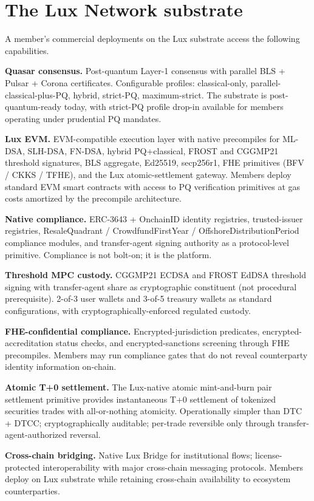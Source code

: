 \documentclass[11pt,letterpaper]{article}
\begin{document}
\section{The Lux Network substrate}

A member's commercial deployments on the Lux substrate access the following capabilities.

\textbf{Quasar consensus.} Post-quantum Layer-1 consensus with parallel BLS + Pulsar + Corona certificates. Configurable profiles: classical-only, parallel-classical-plus-PQ, hybrid, strict-PQ, maximum-strict. The substrate is post-quantum-ready today, with strict-PQ profile drop-in available for members operating under prudential PQ mandates.

\textbf{Lux EVM.} EVM-compatible execution layer with native precompiles for ML-DSA, SLH-DSA, FN-DSA, hybrid PQ+classical, FROST and CGGMP21 threshold signatures, BLS aggregate, Ed25519, secp256r1, FHE primitives (BFV / CKKS / TFHE), and the Lux atomic-settlement gateway. Members deploy standard EVM smart contracts with access to PQ verification primitives at gas costs amortized by the precompile architecture.

\textbf{Native compliance.} ERC-3643 + OnchainID identity registries, trusted-issuer registries, ResaleQuadrant / CrowdfundFirstYear / OffshoreDistributionPeriod compliance modules, and transfer-agent signing authority as a protocol-level primitive. Compliance is not bolt-on; it is the platform.

\textbf{Threshold MPC custody.} CGGMP21 ECDSA and FROST EdDSA threshold signing with transfer-agent share as cryptographic constituent (not procedural prerequisite). 2-of-3 user wallets and 3-of-5 treasury wallets as standard configurations, with cryptographically-enforced regulated custody.

\textbf{FHE-confidential compliance.} Encrypted-jurisdiction predicates, encrypted-accreditation status checks, and encrypted-sanctions screening through FHE precompiles. Members may run compliance gates that do not reveal counterparty identity information on-chain.

\textbf{Atomic T+0 settlement.} The Lux-native atomic mint-and-burn pair settlement primitive provides instantaneous T+0 settlement of tokenized securities trades with all-or-nothing atomicity. Operationally simpler than DTC + DTCC; cryptographically auditable; per-trade reversible only through transfer-agent-authorized reversal.

\textbf{Cross-chain bridging.} Native Lux Bridge for institutional flows; license-protected interoperability with major cross-chain messaging protocols. Members deploy on Lux substrate while retaining cross-chain availability to ecosystem counterparties.
\end{document}
